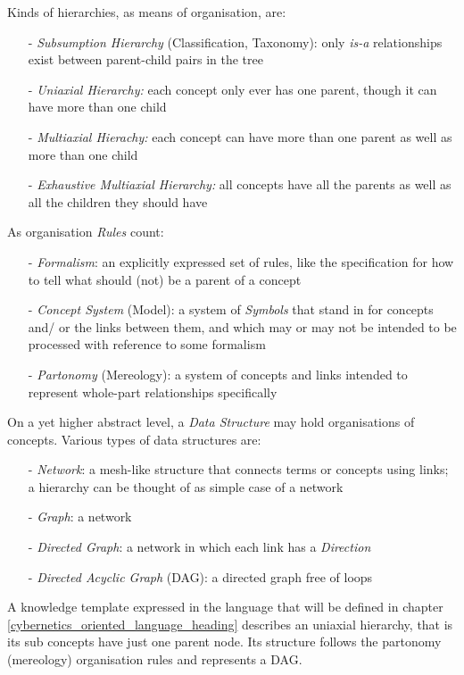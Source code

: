 Kinds of hierarchies, as means of organisation, are:

\begin{itemize}
    \item[-] \emph{Subsumption Hierarchy} (Classification, Taxonomy): only
        \emph{is-a} relationships exist between parent-child pairs in the tree
    \item[-] \emph{Uniaxial Hierarchy:} each concept only ever has one parent,
        though it can have more than one child
    \item[-] \emph{Multiaxial Hierachy:} each concept can have more than one
        parent as well as more than one child
    \item[-] \emph{Exhaustive Multiaxial Hierarchy:} all concepts have all the
        parents as well as all the children they should have
\end{itemize}

As organisation \emph{Rules} count:

\begin{itemize}
    \item[-] \emph{Formalism}: an explicitly expressed set of rules, like the
        specification for how to tell what should (not) be a parent of a concept
    \item[-] \emph{Concept System} (Model): a system of \emph{Symbols} that
        stand in for concepts and/ or the links between them, and which may or
        may not be intended to be processed with reference to some formalism
    \item[-] \emph{Partonomy} (Mereology): a system of concepts and links
        intended to represent whole-part relationships specifically
\end{itemize}

On a yet higher abstract level, a \emph{Data Structure} may hold organisations
of concepts. Various types of data structures are:

\begin{itemize}
    \item[-] \emph{Network}: a mesh-like structure that connects terms or concepts
        using links; a hierarchy can be thought of as simple case of a network
    \item[-] \emph{Graph}: a network
    \item[-] \emph{Directed Graph}: a network in which each link has a \emph{Direction}
    \item[-] \emph{Directed Acyclic Graph} (DAG): a directed graph free of loops
\end{itemize}

A knowledge template expressed in the language that will be defined in chapter
\ref{cybernetics_oriented_language_heading} describes an uniaxial hierarchy,
that is its sub concepts have just one parent node. Its structure follows the
partonomy (mereology) organisation rules and represents a DAG.
